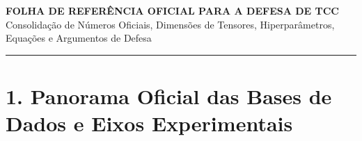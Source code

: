 \documentclass[10pt,a4paper]{article}
\begin{document}
\begin{center}
  {\Large \textbf{\textsf{\color{NavyBlue}FOLHA DE REFERÊNCIA OFICIAL PARA A DEFESA DE TCC}}}\\[0.15cm]
  {\normalsize \textsf{\color{DarkSlateGray}Consolidação de Números Oficiais, Dimensões de Tensores, Hiperparâmetros, Equações e Argumentos de Defesa}}\\[0.1cm]
  \rule{\textwidth}{1.2pt}
\end{center}
\vspace{-0.3cm}

\section*{1. Panorama Oficial das Bases de Dados e Eixos Experimentais}
\end{document}
